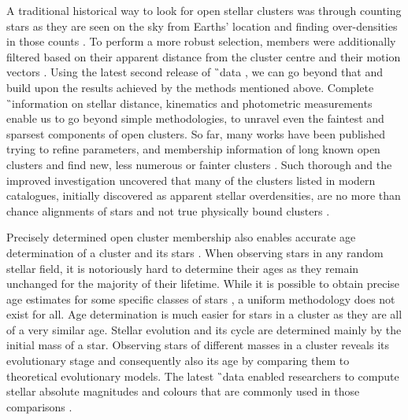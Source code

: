 A traditional historical way to look for open stellar clusters was through counting stars as they are seen on the sky from Earths' location and finding over-densities in those counts \cite{1988AJ.....95..108L, 2014A&A...568A..51S}. To perform a more robust selection, members were additionally filtered based on their apparent distance from the cluster centre and their motion vectors \cite{2017A&A...601A..19G}. Using the latest second release of \G\ data \citep[DR2,][]{2018A&A...616A...1G}, we can go beyond that and build upon the results achieved by the methods mentioned above. Complete \G\ information on stellar distance, kinematics and photometric measurements enable us to go beyond simple methodologies, to unravel even the faintest and sparsest components of open clusters. So far, many works have been published trying to refine parameters, and membership information of long known open clusters \cite{2017A&A...601A..19G, 2018A&A...618A..93C, 2019A&A...627A..35C} and find new, less numerous or fainter clusters \cite{2019arXiv190904612B, 2019ApJS..245...32L, 2019JKAS...52..145S, 2019A&A...624A.126C, 2020arXiv200107122C}. Such thorough and the improved investigation uncovered that many of the clusters listed in modern catalogues, initially discovered as apparent stellar overdensities, are no more than chance alignments of stars and not true physically bound clusters \cite{1998A&A...340..402B, 2000A&A...357..145C, 2016AJ....152....7H, 2018MNRAS.480.5242K, 2020A&A...633A..99C}.

Precisely determined open cluster membership also enables accurate age determination of a cluster and its stars \cite{2018ApJ...863...65C}. When observing stars in any random stellar field, it is notoriously hard to determine their ages as they remain unchanged for the majority of their lifetime. While it is possible to obtain precise age estimates for some specific classes of stars \cite{2010ARA&A..48..581S}, a uniform methodology does not exist for all. Age determination is much easier for stars in a cluster as they are all of a very similar age. Stellar evolution and its cycle are determined mainly by the initial mass of a star. Observing stars of different masses in a cluster reveals its evolutionary stage and consequently also its age by comparing them to theoretical evolutionary models. The latest \G\ data enabled researchers to compute stellar absolute magnitudes and colours that are commonly used in those comparisons \cite{2019MNRAS.487.2385M, 2019A&A...623A.108B, 2019A&A...631A.166K}.


